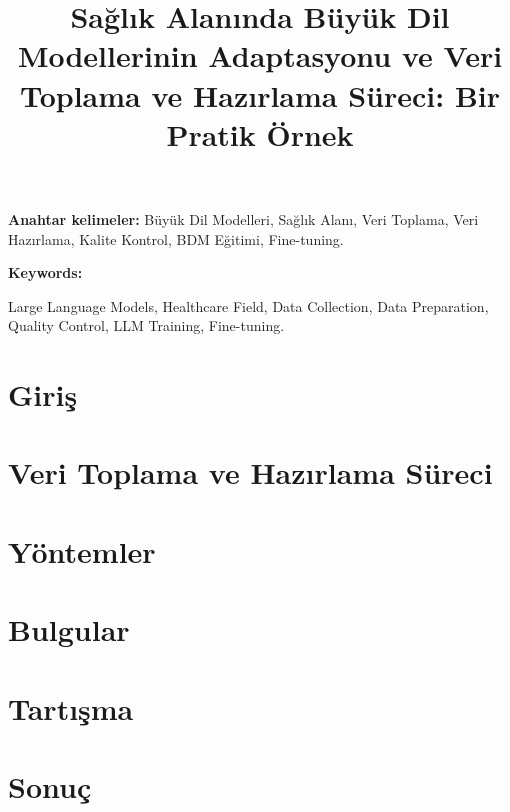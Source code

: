 \documentclass[conference]{IEEEtran}
\newenvironment{anahtarkelimeler}{
    \small
    \textbf{Anahtar kelimeler:}
}{}
\newenvironment{keywords}{
    \small
    \textbf{Keywords:}
}{}
\begin{document}
\title{Sağlık Alanında Büyük Dil Modellerinin Adaptasyonu ve Veri Toplama ve Hazırlama Süreci: Bir Pratik Örnek}


\author{
}

\maketitle

\begin{abstract}
    
\end{abstract}

\begin{anahtarkelimeler}Büyük Dil Modelleri, Sağlık Alanı, Veri Toplama, Veri Hazırlama, Kalite Kontrol, BDM Eğitimi, Fine-tuning.
\end{anahtarkelimeler}

\hspace{0.15in}


\begin{abstract}
    
\end{abstract}
\begin{keywords}
    Large Language Models, Healthcare Field, Data Collection, Data Preparation, Quality Control, LLM Training, Fine-tuning.
\end{keywords}  

\section{Giriş}


\section{Veri Toplama ve Hazırlama Süreci}


\section{Yöntemler}


\section{Bulgular}


\section{Tartışma}


\section{Sonuç}




\end{document}
